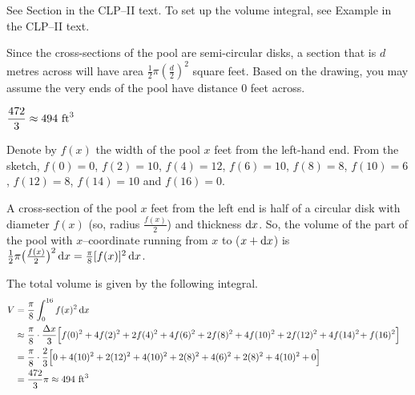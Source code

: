 \begin{hint}
See Section  in the
CLP--II text.
To set up the volume integral, see Example  in the
CLP--II text.

Since the cross-sections of the pool are semi-circular disks, a section that is $d$ metres across will have area $\frac{1}{2}\pi\left(\frac{d}{2}\right)^2$ square feet.  Based on the drawing, you may assume the very ends of the pool have distance 0 feet across.
\end{hint}

\begin{answer}
$\dfrac{472}{3}\approx 494 \ {\rm ft}^3$
\end{answer}

\begin{solution}
 Denote by $f(x)$ the width of the pool  $x$ feet
from the left-hand end. From the sketch, $f(0)=0$, $f(2)=10$, $f(4)=12$, $f(6)=10$,
$f(8)=8$, $f(10)=6$, $f(12)=8$, $f(14)=10$ and $f(16)=0$.

A cross-section of the pool $x$ feet from the left end is half of a circular disk with diameter $f(x)$ (so, radius $\frac{f(x)}{2}$) and thickness $\mathrm{d}x$. So, the volume of
the part of the pool with $x$--coordinate running from $x$ to ($x+\mathrm{d}x$) is
$\tfrac{1}{2}\pi\big(\frac{f(x)}{2}\big)^2\,\mathrm{d}x = \frac{\pi}{8}[f(x)]^2\,\mathrm{d}x$.


The total volume is given by the following integral.
\begin{align*}
V&=\frac{\pi}{8}\int_0^{16}f(x)^2\,\mathrm{d}x\cr
&\approx\frac{\pi}{8}\cdot\frac{\Delta x}{3}
\Big[f(0)^2+4f(2)^2+2f(4)^2+4f(6)^2+2f(8)^2
+4f(10)^2+2f(12)^2+4f(14)^2\!+f(16)^2\Big]\cr
&=\frac{\pi}{8}\cdot\frac{2}{3}
\Big[0+4(10)^2+2(12)^2+4(10)^2+2(8)^2
+4(6)^2+2(8)^2+4(10)^2+0\Big]\cr
&=\frac{472}{3}\pi\approx 494 \ {\rm ft}^3
\end{align*}

\end{solution}

